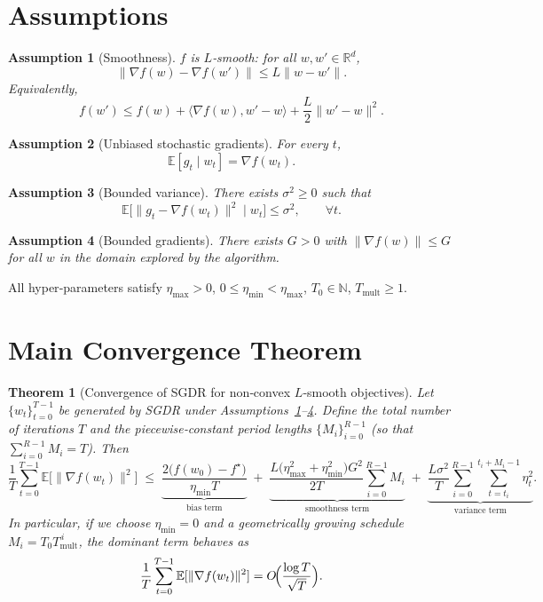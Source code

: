 \documentclass{article}
\newtheorem{theorem}{Theorem}
\newtheorem{assumption}{Assumption}
\newcommand{\E}{\mathbb{E}}
\newcommand{\R}{\mathbb{R}}
\begin{document}
\newpage
\section*{Assumptions}
\begin{assumption}[Smoothness]\label{ass:smooth}
$f$ is $L$‑smooth: for all $w,w'\in\R^d$,
\[
\|\nabla f(w)-\nabla f(w')\|\le L\|w-w'\|.
\]
Equivalently,
\[
f(w')\le f(w)+\langle\nabla f(w),w'-w\rangle+\frac{L}{2}\|w'-w\|^2.
\tag{3}
\]
\end{assumption}

\begin{assumption}[Unbiased stochastic gradients]\label{ass:unbiased}
For every $t$,
\[
\E[g_t\mid w_t]=\nabla f(w_t).
\tag{4}
\]
\end{assumption}

\begin{assumption}[Bounded variance]\label{ass:var}
There exists $\sigma^2\ge0$ such that
\[
\E\bigl[\|g_t-\nabla f(w_t)\|^2\mid w_t\bigr]\le\sigma^2,\qquad\forall t.
\tag{5}
\]
\end{assumption}

\begin{assumption}[Bounded gradients]\label{ass:bound}
There exists $G>0$ with $\|\nabla f(w)\|\le G$ for all $w$ in the domain explored by the algorithm.
\end{assumption}

All hyper‑parameters satisfy $\eta_{\max}>0$, $0\le\eta_{\min}<\eta_{\max}$, $T_0\in\mathbb N$, $T_{\text{mult}}\ge1$.

\section*{Main Convergence Theorem}
\begin{theorem}[Convergence of SGDR for non‑convex $L$‑smooth objectives]\label{thm:sgdr}
Let $\{w_t\}_{t=0}^{T-1}$ be generated by SGDR under Assumptions~\ref{ass:smooth}–\ref{ass:bound}. Define the total number of iterations $T$ and the piecewise‑constant period lengths $\{M_i\}_{i=0}^{R-1}$ (so that $\sum_{i=0}^{R-1}M_i=T$). Then
\[
\frac{1}{T}\sum_{t=0}^{T-1}\E\bigl[\|\nabla f(w_t)\|^2\bigr]
\;\le\;
\underbrace{\frac{2\bigl(f(w_0)-f^\star\bigr)}{\eta_{\min} T}}_{\text{bias term}}
\;+\;
\underbrace{\frac{L\bigl(\eta_{\max}^2+\eta_{\min}^2\bigr)G^2}{2T}\sum_{i=0}^{R-1}M_i}_{\text{smoothness term}}
\;+\;
\underbrace{\frac{L\sigma^2}{T}\sum_{i=0}^{R-1}\sum_{t=t_i}^{t_i+M_i-1}\eta_t^2}_{\text{variance term}}.
\tag{7}
\]
In particular, if we choose $\eta_{\min}=0$ and a geometrically growing schedule $M_i=T_0T_{\text{mult}}^{\,i}$, the dominant term behaves as
\[
\frac{1}{T}\sum_{t=0}^{T-1}\E[\|\nabla f(w_t)\|^2]=O\!\Bigl(\frac{\log T}{\sqrt{T}}\Bigr).
\]
\end{theorem}
\end{document}
